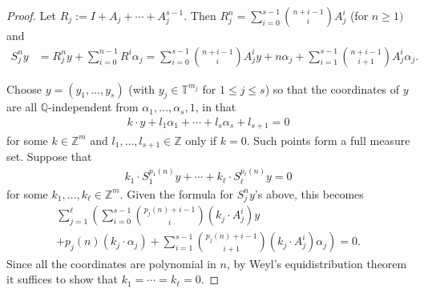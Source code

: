 \documentclass[11pt]{amsart}
\theoremstyle{definition}
\newcommand{\Q}{{\mathbb Q}}
\newcommand{\T}{{\mathbb T}}
\newcommand{\Z}{{\mathbb Z}}
\newcommand{\1}{{\mathbf{1}}}
\newcommand{\brac}[1]{\mathopen{}\left( #1 \mathclose{}\right)}
\begin{document}
\begin{proof}
    Let $R_j:=I+ A_j + \cdots + A_j^{s-1}$. Then $R_j^n=\sum_{i=0}^{s-1}\binom{n+i-1}{i}A_j^i$ (for $n\geq 1)$ and 
    \begin{align*}
        S_j^n y &= R_j^n y + \sum_{i=0}^{n-1}R^i\alpha_j %
        = \sum_{i=0}^{s-1}\binom{n+i-1}{i}A_j^iy + n\alpha_j + \sum_{i=1}^{s-1}\binom{n+i-1}{i+1}A_j^i\alpha_j.
    \end{align*}
    

    Choose $y=(y_1, \ldots, y_s)$ (with $y_{j}\in\T^{m_{j}}$ for $1\leq j\leq s$) so that the coordinates of $y$ are all $\Q$-independent from $\alpha_1, \ldots, \alpha_s, 1$, in that
    \begin{align*}
        k\cdot y + l_1 \alpha_1 + \cdots + l_s \alpha_s + l_{s+1} = 0
    \end{align*}
    for some $k\in\Z^m$ and $l_1, \ldots, l_{s+1}\in\Z$ only if $k = 0$.
    Such points form a full measure set. Suppose that
    \begin{align*}%
        k_1\cdot S_1^{p_1(n)}y + \cdots + k_\ell \cdot S_\ell^{p_\ell(n)}y = 0
    \end{align*}
    for some $k_1, \ldots, k_\ell\in\Z^m$. Given the formula for $S_j^n y$'s above, this becomes
    \begin{multline}\label{E: linear combo 2}
        \sum_{j=1}^\ell \left(\sum_{i=0}^{s-1}\binom{p_j(n)+i-1}{i}(k_j\cdot A_j^i)y\right.\\
        \left.+ p_j(n)(k_j\cdot\alpha_j) + \sum_{i=1}^{s-1}\binom{p_j(n)+i-1}{i+1}(k_j\cdot A_j^i)\alpha_j\right) = 0.
    \end{multline}
    Since all the coordinates are polynomial in $n$, by Weyl's equidistribution theorem it suffices to show that $k_1 = \cdots = k_\ell = 0$.


\end{proof}
\end{document}
